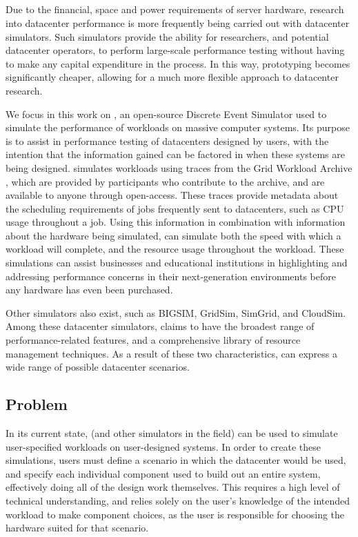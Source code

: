 \documentclass[11pt]{article}
\begin{document}
	\subsection{\opendc{}}
		Due to the financial, space and power requirements of server hardware, research into datacenter performance is more frequently being carried out with datacenter simulators.
		Such simulators provide the ability for researchers, and potential datacenter operators, to perform large-scale performance testing without having to make any capital expenditure in the process.
		In this way, prototyping becomes significantly cheaper, allowing for a much more flexible approach to datacenter research\cite{Iosup2017}.

		We focus in this work on \opendc{}, an open-source Discrete Event Simulator used to simulate the performance of workloads on massive computer systems\cite{Iosup2017}. 
		Its purpose is to assist in performance testing of datacenters designed by users, with the intention that the information gained can be factored in when these systems are being designed. 
		\opendc{} simulates workloads using traces from the Grid Workload Archive \cite{Iosup2008}, which are provided by participants who contribute to the archive, and are available to anyone through open-access. 
		These traces provide metadata about the scheduling requirements of jobs frequently sent to datacenters, such as CPU usage throughout a job. 
		Using this information in combination with information about the hardware being simulated, \opendc{} can simulate both the speed with which a workload will complete, and the resource usage throughout the workload. 
		These simulations can assist businesses and educational institutions in highlighting and addressing performance concerns in their next-generation environments before any hardware has even been purchased.

		Other simulators also exist, such as BIGSIM\cite{Zheng2004}, GridSim\cite{Buyya2002}, SimGrid\cite{Casanova2008}, and CloudSim\cite{Calheiros2011}.
		Among these datacenter simulators, \opendc{} claims to have the broadest range of performance-related features\cite{Andreadis2018}, and a comprehensive library of resource management techniques.
		As a result of these two characteristics, \opendc{} can express a wide range of possible datacenter scenarios.
	
	\subsection{Problem}
		In its current state, \opendc{} (and other simulators in the field) can be used to simulate user-specified workloads on user-designed systems. 
		In order to create these simulations, users must define a scenario in which the datacenter would be used, and specify each individual component used to build out an entire system, effectively doing all of the design work themselves. 
		This requires a high level of technical understanding, and relies solely on the user's knowledge of the intended workload to make component choices, as the user is responsible for choosing the hardware suited for that scenario. 
		
\end{document}
